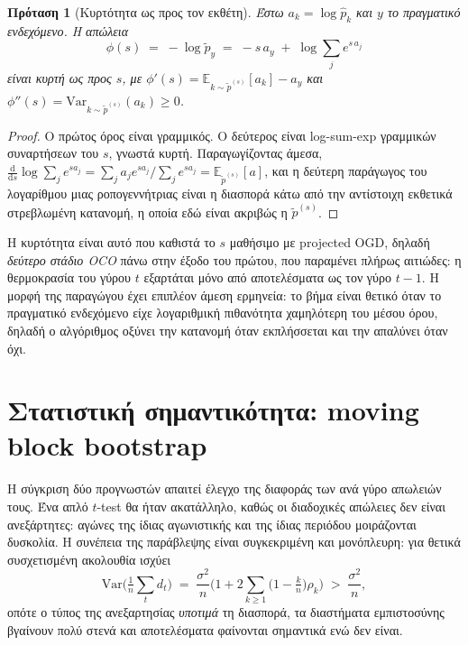 \documentclass[12pt,a4paper,oneside]{report}
\newcommand{\en}[1]{\textenglish{#1}}
\renewcommand{\_}{\oldunderscore\allowbreak}
\theoremstyle{definition}
\theoremstyle{plain}
\newtheorem{proposition}[theorem]{Πρόταση}
\theoremstyle{remark}
\begin{document}
\begin{proposition}[Κυρτότητα ως προς τον εκθέτη]
\label{prop:temp-convex}
Έστω $a_k = \log \hat{p}_k$ και $y$ το πραγματικό ενδεχόμενο. Η απώλεια
\[
\phi(s) \;=\; -\log \tilde{p}_y \;=\; -s\,a_y \;+\; \log \sum_j e^{s\,a_j}
\]
είναι κυρτή ως προς $s$, με $\phi'(s) = \mathbb{E}_{k\sim \tilde{p}^{(s)}}[a_k] - a_y$ και
$\phi''(s) = \mathrm{Var}_{k\sim \tilde{p}^{(s)}}(a_k) \geq 0$.
\end{proposition}

\begin{proof}
Ο πρώτος όρος είναι γραμμικός. Ο δεύτερος είναι \en{log-sum-exp} γραμμικών συναρτήσεων του
$s$, γνωστά κυρτή. Παραγωγίζοντας άμεσα, $\frac{\mathrm{d}}{\mathrm{d}s}\log\sum_j e^{sa_j}
= \sum_j a_j e^{sa_j}/\sum_j e^{sa_j} = \mathbb{E}_{\tilde{p}^{(s)}}[a]$, και η δεύτερη
παράγωγος του λογαρίθμου μιας ροπογεννήτριας είναι η διασπορά κάτω από την αντίστοιχη
εκθετικά στρεβλωμένη κατανομή, η οποία εδώ είναι ακριβώς η $\tilde{p}^{(s)}$.
\end{proof}

Η κυρτότητα είναι αυτό που καθιστά το $s$ μαθήσιμο με projected OGD, δηλαδή \emph{δεύτερο
στάδιο OCO} πάνω στην έξοδο του πρώτου, που παραμένει πλήρως αιτιώδες: η θερμοκρασία του
γύρου $t$ εξαρτάται μόνο από αποτελέσματα ως τον γύρο $t-1$. Η μορφή της παραγώγου έχει
επιπλέον άμεση ερμηνεία: το βήμα είναι θετικό όταν το πραγματικό ενδεχόμενο είχε
λογαριθμική πιθανότητα χαμηλότερη του μέσου όρου, δηλαδή ο αλγόριθμος οξύνει την κατανομή
όταν εκπλήσσεται και την απαλύνει όταν όχι.

\section{Στατιστική σημαντικότητα: moving block bootstrap}
\label{sec:bootstrap-theory}

Η σύγκριση δύο προγνωστών απαιτεί έλεγχο της διαφοράς των ανά γύρο απωλειών τους. Ένα απλό
$t$-test θα ήταν ακατάλληλο, καθώς οι διαδοχικές απώλειες δεν είναι ανεξάρτητες: αγώνες της
ίδιας αγωνιστικής και της ίδιας περιόδου μοιράζονται δυσκολία. Η συνέπεια της παράβλεψης
είναι συγκεκριμένη και μονόπλευρη: για θετικά συσχετισμένη ακολουθία ισχύει
\[
\mathrm{Var}\Big(\tfrac{1}{n}\sum_t d_t\Big) \;=\; \frac{\sigma^2}{n}
\Big( 1 + 2\sum_{k\geq 1} \big(1-\tfrac{k}{n}\big)\rho_k \Big) \;>\; \frac{\sigma^2}{n},
\]
οπότε ο τύπος της ανεξαρτησίας \emph{υποτιμά} τη διασπορά, τα διαστήματα εμπιστοσύνης βγαίνουν
πολύ στενά και αποτελέσματα φαίνονται σημαντικά ενώ δεν είναι.
\end{document}
